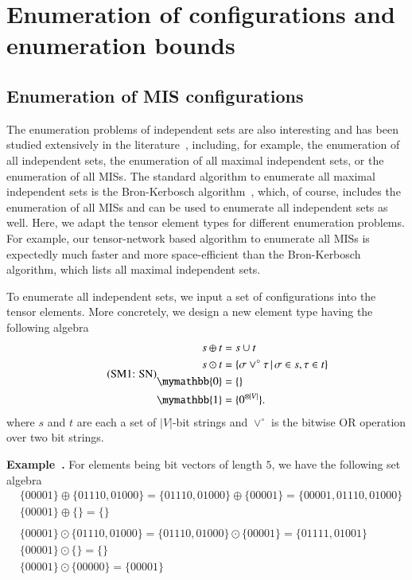 \documentclass[onefignum, onetabnum]{siamart190516}
\newcommand{\eqname}[1]{\stepcounter{equation}\tag{\theequation : #1}}
\newcommand{\<}{\langle}
\renewcommand{\>}{\rangle}
\newcounter{example}
\newenvironment{example}[1][]{\refstepcounter{example}\par\medskip
   \noindent \textbf{Example~\theexample. #1} \rmfamily}{\medskip}
\begin{document}
\section{Enumeration of configurations and enumeration bounds}
\subsection{Enumeration of MIS configurations}
The enumeration problems of independent sets are also interesting and has been studied extensively in the literature~\cite{Bron1973, Eppstein2010, Johnson1988}, including,
for example, the enumeration of all independent sets, the enumeration of all maximal independent sets, or the enumeration of all MISs.
The standard algorithm to enumerate all maximal independent sets is the Bron-Kerbosch algorithm~\cite{Bron1973}, which, of course, includes the enumeration of all MISs and can be used to enumerate all independent sets as well.
Here, we adapt the tensor element types for different enumeration problems.
For example, our tensor-network based algorithm to enumerate all MISs is expectedly much faster and more space-efficient than the Bron-Kerbosch algorithm, which lists all maximal independent sets. 

To enumerate all independent sets, we input a set of configurations into the tensor elements. More concretely, we design a new element type having the following algebra
\begin{equation}
\eqname{SN}
\begin{split}
    s \oplus t &= s \cup t\\
    s \odot t &= \{\sigma \lor^\circ \tau \, | \, \sigma \in s, \tau \in t\}\\
    \mymathbb{0} &= \{\}\\
    \mymathbb{1} &= \{0^{\otimes |V|}\}.
\end{split}\label{eq:set}
\end{equation}
where $s$ and $t$ are each a set of $|V|$-bit strings and $\lor^\circ$ is the bitwise OR operation over two bit strings.
\begin{example}\label{eg:setalgebra}
    For elements being bit vectors of length $5$, we have the following set algebra
\begin{equation*}
\begin{split}
    &\{00001\} \oplus \{01110, 01000\} = \{01110, 01000\} \oplus \{00001\} = \{00001,01110, 01000\}\\
    &\{00001\} \oplus \{\} = \{\}\\
&\\
    &\{00001\} \odot \{01110, 01000\} = \{01110, 01000\} \odot \{00001\} = \{01111, 01001\}\\
    &\{00001\} \odot \{\} = \{\}\\
    &\{00001\} \odot \{00000\} = \{00001\}
\end{split}
\end{equation*}
\end{example}
\end{document}
